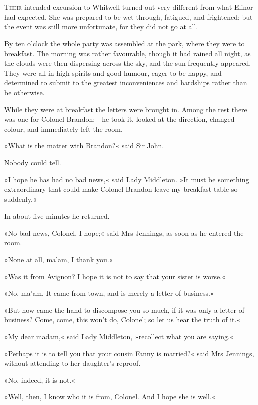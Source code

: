 \chapter[Chapter \thechapter]{}
\lettrine[lines=4,lraise=0.3]{T}{heir} intended excursion to Whitwell turned out very different from what Elinor had expected. She was prepared to be wet through, fatigued, and frightened; but the event was still more unfortunate, for they did not go at all.

By ten o’clock the whole party was assembled at the park, where they were to breakfast. The morning was rather favourable, though it had rained all night, as the clouds were then dispersing across the sky, and the sun frequently appeared. They were all in high spirits and good humour, eager to be happy, and determined to submit to the greatest inconveniences and hardships rather than be otherwise.

While they were at breakfast the letters were brought in. Among the rest there was one for Colonel Brandon;—he took it, looked at the direction, changed colour, and immediately left the room.

»What is the matter with Brandon?« said Sir John.

Nobody could tell.

»I hope he has had no bad news,« said Lady Middleton. »It must be something extraordinary that could make Colonel Brandon leave my breakfast table so suddenly.«

In about five minutes he returned.

»No bad news, Colonel, I hope;« said Mrs Jennings, as soon as he entered the room.

»None at all, ma’am, I thank you.«

»Was it from Avignon? I hope it is not to say that your sister is worse.«

»No, ma’am. It came from town, and is merely a letter of business.«

»But how came the hand to discompose you so much, if it was only a letter of business? Come, come, this won’t do, Colonel; so let us hear the truth of it.«

»My dear madam,« said Lady Middleton, »recollect what you are saying.«

»Perhaps it is to tell you that your cousin Fanny is married?« said Mrs Jennings, without attending to her daughter’s reproof.

»No, indeed, it is not.«

»Well, then, I know who it is from, Colonel. And I hope she is well.«

